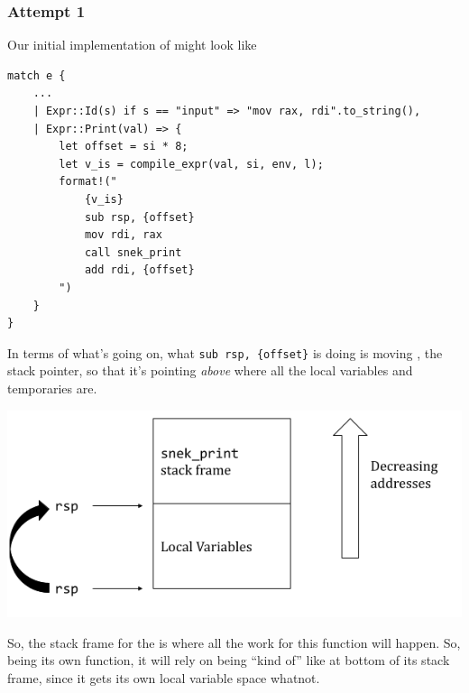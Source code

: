\subsubsection{Attempt 1}
Our initial implementation of  might look like 
\begin{verbatim}
match e {
    ... 
    | Expr::Id(s) if s == "input" => "mov rax, rdi".to_string(),
    | Expr::Print(val) => {
        let offset = si * 8; 
        let v_is = compile_expr(val, si, env, l);
        format!("
            {v_is}
            sub rsp, {offset}
            mov rdi, rax 
            call snek_print
            add rdi, {offset}
        ")
    }
}\end{verbatim}
In terms of what's going on, what \verb|sub rsp, {offset}| is doing is moving , the stack pointer, so that it's pointing \emph{above} where all the local variables and temporaries are.  
\begin{center}
    \includegraphics[scale=0.5]{assets/rsp_offset_subtract.png}
\end{center}
So, the stack frame for the  is where all the work for this function will happen. So, being its own function, it will rely on  being ``kind of'' like at bottom of its stack frame, since it gets its own local variable space whatnot. 

